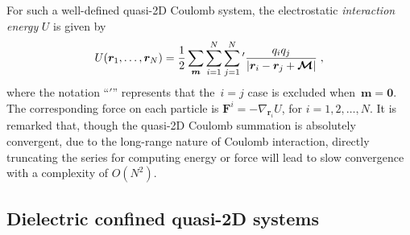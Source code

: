 For such a well-defined quasi-2D Coulomb system, the electrostatic \emph{interaction energy} $U$ is given by
\begin{equation} \label{eq::U_pair}
	U(\bm{r}_1, \ldots,\bm{r}_N)= \frac{1}{2} \sum_{\boldsymbol{m}} \sum_{i=1}^{N} \sum_{j=1}^N {}^\prime \frac{q_i q_j} {|\bm{r}_{i}-\bm{r}_{j} + \bm{\mathcal{M}}|}\;,
\end{equation}
where the notation ``$\prime$'' represents that the~$i = j$ case is excluded when~$\bm{m} = \bm{0}$.
The corresponding force on each particle is $\bm{F}^i=-\nabla_{\bm{r}_{i}} U$, for $i=1,2,\ldots, N$.
It is remarked that, though the quasi-2D Coulomb summation is absolutely convergent, due to the long-range nature of Coulomb interaction, directly truncating the series for computing energy or force will lead to slow convergence with a complexity of $O(N^2)$.


\subsection{Dielectric confined quasi-2D systems}

